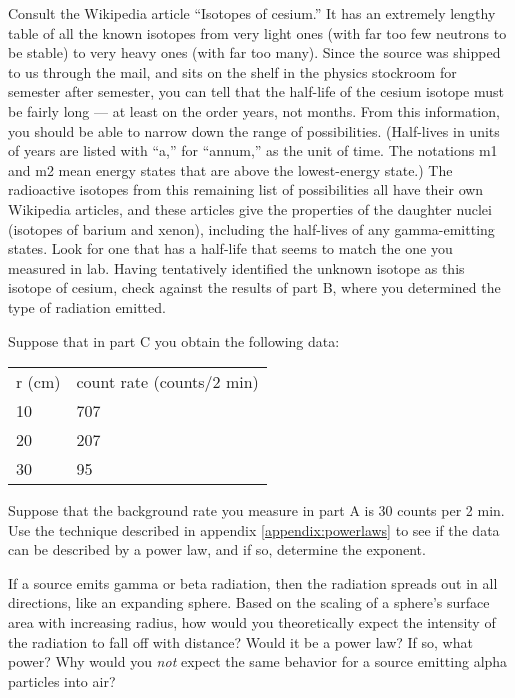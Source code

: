 Consult the Wikipedia article ``Isotopes of cesium.'' It has an extremely lengthy
table of all the known isotopes from very light ones (with far too few neutrons to
be stable) to very heavy ones (with far too many). Since the source was shipped to us
through the mail, and sits on the shelf in the physics stockroom for semester after
semester, you can tell that the half-life of the cesium isotope must be fairly long ---
at least on the order years, not months. From this information, you should be able
to narrow down the range of possibilities. (Half-lives in units of years are listed with
``a,'' for ``annum,'' as the unit of time. The notations m1 and m2 mean energy states
that are above the lowest-energy state.) The radioactive isotopes from this remaining
list of possibilities all have their own Wikipedia articles, and these articles give
the properties of the daughter nuclei (isotopes of barium and xenon), including the half-lives
of any gamma-emitting states. Look for one that has a half-life that seems to match
the one you measured in lab. Having tentatively identified the unknown isotope as
this isotope of cesium, check against the results of part B, where you determined
the type of radiation emitted.

\prelab

\prelabquestion
Suppose that in part C you obtain the following data:

\begin{tabular}{ll}
r (cm) & count rate (counts/2 min) \\
10      & 707 \\
20     & 207 \\
30     & 95
\end{tabular}

Suppose that the background rate you measure in part A
is 30 counts per 2 min. Use the technique
described in appendix \ref{appendix:powerlaws} to see if the data can be described
by a power law, and if so, determine the exponent.

\prelabquestion
If a source emits gamma or beta radiation, then the radiation spreads out in all
directions, like an expanding sphere. Based on the scaling of a sphere's surface
area with increasing radius, how would you theoretically expect the
intensity of the radiation to fall off with distance? Would it be a power law?
If so, what power? Why would you \emph{not} expect the same behavior for a source
emitting alpha particles into air?
